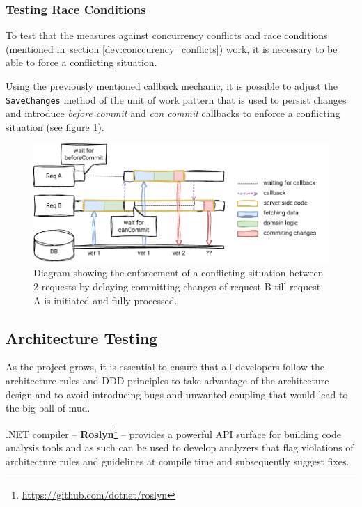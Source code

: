 \subsubsection{Testing Race Conditions}
To test that the measures against concurrency conflicts and race conditions (mentioned in~section \ref{dev:conccurency_conflicts}) work, it is necessary to be able to force a conflicting situation.

Using the previously mentioned callback mechanic, it is possible to adjust the \texttt{SaveChanges} method of the unit of work pattern that is used to persist changes and introduce \textit{before commit} and \textit{can commit} callbacks to enforce a conflicting situation (see figure \ref{fig:race_condition}). 

\begin{figure} [H]
    \centering
    \includegraphics[width=\textwidth]{figures/race-condition.pdf}
    \caption{Diagram showing the enforcement of a conflicting situation between 2 requests by delaying committing changes of request B till request A is initiated and fully processed.}
    \label{fig:race_condition}
\end{figure}

\subsection{Architecture Testing}
\label{dev:arch_testing}
As the project grows, it is essential to ensure that all developers follow the architecture rules and DDD principles to take advantage of the architecture design and to avoid introducing bugs and unwanted coupling that would lead to the big ball of mud.

.NET compiler -- \textbf{Roslyn}\footnote{\url{https://github.com/dotnet/roslyn}} -- provides a powerful API surface for building code analysis tools and as such can be used to develop analyzers that flag violations of architecture rules and guidelines at compile time and subsequently suggest fixes. 

